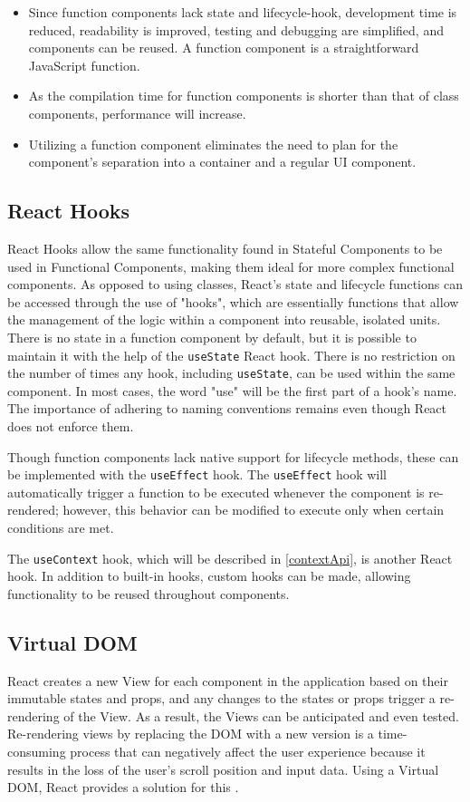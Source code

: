 \begin{itemize}
  \item Since function components lack state and lifecycle-hook, development time is reduced, readability is improved, testing and debugging are simplified, and components can be reused. A function component is a straightforward JavaScript function.
  \item As the compilation time for function components is shorter than that of class components, performance will increase.
  \item Utilizing a function component eliminates the need to plan for the component's separation into a container and a regular UI component.
\end{itemize}

\subsection{React Hooks}
\label{react_hooks}
React Hooks allow the same functionality found in Stateful Components to be used in Functional Components, making them ideal for more complex functional components. As opposed to using classes, React's state and lifecycle functions can be accessed through the use of "hooks", which are essentially functions that allow the management of the logic within a component into reusable, isolated units. There is no state in a function component by default, but it is possible to maintain it with the help of the \texttt{useState} React hook. There is no restriction on the number of times any hook, including \texttt{useState}, can be used within the same component. In most cases, the word "use" will be the first part of a hook's name. The importance of adhering to naming conventions remains even though React does not enforce them.

Though function components lack native support for lifecycle methods, these can be implemented with the \texttt{useEffect} hook. The \texttt{useEffect} hook will automatically trigger a function to be executed whenever the component is re-rendered; however, this behavior can be modified to execute only when certain conditions are met.

The \texttt{useContext} hook, which will be described in \autoref{contextApi}, is another React hook. In addition to built-in hooks, custom hooks can be made, allowing functionality to be reused throughout components.

\subsection{Virtual DOM}
React creates a new View for each component in the application based on their immutable states and props, and any changes to the states or props trigger a re-rendering of the View. As a result, the Views can be anticipated and even tested. Re-rendering views by replacing the DOM with a new version is a time-consuming process that can negatively affect the user experience because it results in the loss of the user's scroll position and input data. Using a Virtual DOM, React provides a solution for this \autocite{david2020building}.

